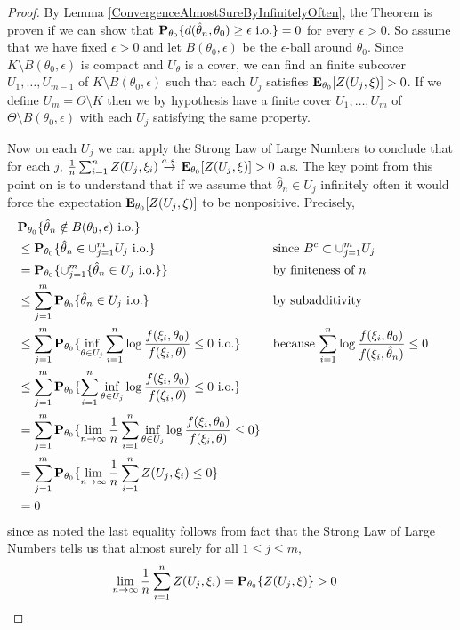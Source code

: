 \begin{proof}
By Lemma \ref{ConvergenceAlmostSureByInfinitelyOften}, the Theorem is proven if we can show that
$\sprobability{ d(\hat{\theta}_n, \theta_0) \geq \epsilon \text{
  i.o.}}{\theta_0}= 0$
for every $\epsilon > 0$.  
So assume that we have fixed $\epsilon > 0$ and let $B(\theta_0,
\epsilon)$ be the $\epsilon$-ball around $\theta_0$.  Since $K
\setminus B(\theta_0, \epsilon)$ is compact and $U_\theta$ is a cover,
we can find an finite subcover $U_1, \dots, U_{m-1}$ of $K
\setminus B(\theta_0, \epsilon)$ such that each $U_j$ satisfies
$\sexpectation{Z(U_j, \xi)}{\theta_0} > 0$.  If we define $U_m
= \Theta\setminus K$ then we by hypothesis have a finite cover $U_1, \dots,
U_m$ of $\Theta
\setminus B(\theta_0, \epsilon)$ with each $U_j$ satisfying the same
property.

Now on each $U_j$ we can apply the Strong Law of Large Numbers to
conclude that for each $j$, $\frac{1}{n} \sum_{i=1}^n Z(U_j, \xi_i)
\toas \sexpectation{Z(U_j, \xi)}{\theta_0} > 0$ a.s. The key
point from this point on is to understand that if we assume that
$\hat{\theta}_n \in U_j$ infinitely often it would force the
expectation $\sexpectation{Z(U_j, \xi)}{\theta_0}$ to be nonpositive.  Precisely,
\begin{align*}
&\sprobability{\hat{\theta}_n \notin B(\theta_0, \epsilon) \text{
    i.o.}}{\theta_0} \\
&\leq \sprobability{\hat{\theta}_n
  \in \cup_{j=1}^m U_j \text{ i.o.}}{\theta_0} & & \text{since $B^c
  \subset \cup_{j=1}^m U_j $}\\
&= \sprobability{\cup_{j=1}^m \lbrace \hat{\theta}_n
  \in U_j \text{ i.o.} \rbrace }{\theta_0}  & & \text{by
    finiteness of $n$}  \\
&\leq \sum_{j=1}^m \sprobability{\hat{\theta}_n
  \in U_j \text{ i.o.}}{\theta_0} & & \text{by
  subadditivity} \\
&\leq \sum_{j=1}^m \sprobability{\inf_{\theta \in U_j} \sum_{i=1}^n
  \log \frac{f(\xi_i, \theta_0)}{f(\xi_i, \theta)} \leq 0 \text{
    i.o.}}{\theta_0} & & \text{because $\sum_{i=1}^n
  \log \frac{f(\xi_i, \theta_0)}{f(\xi_i, \hat{\theta}_n)} \leq 0$ } \\
&\leq \sum_{j=1}^m \sprobability{\sum_{i=1}^n \inf_{\theta \in U_j} 
  \log \frac{f(\xi_i, \theta_0)}{f(\xi_i, \theta)} \leq 0 \text{
    i.o.}}{\theta_0} \\
&= \sum_{j=1}^m \sprobability{\lim_{n \to \infty} \frac{1}{n}\sum_{i=1}^n \inf_{\theta \in U_j} 
  \log \frac{f(\xi_i, \theta_0)}{f(\xi_i, \theta)} \leq 0}{\theta_0}
\\
&= \sum_{j=1}^m \sprobability{\lim_{n \to    \infty} \frac{1}{n}
  \sum_{i=1}^n  Z(U_j, \xi_i) \leq 0 }{\theta_0}\\
&=0
\end{align*}
since as noted the last equality follows from fact that the Strong Law of Large Numbers tells us that almost
surely for all $1 \leq j \leq m$,
\begin{align*}
\lim_{n \to    \infty} \frac{1}{n} \sum_{i=1}^n  Z(U_j, \xi_i) &=
  \sprobability{Z(U_j, \xi)}{\theta_0} > 0
\end{align*}
\end{proof}

